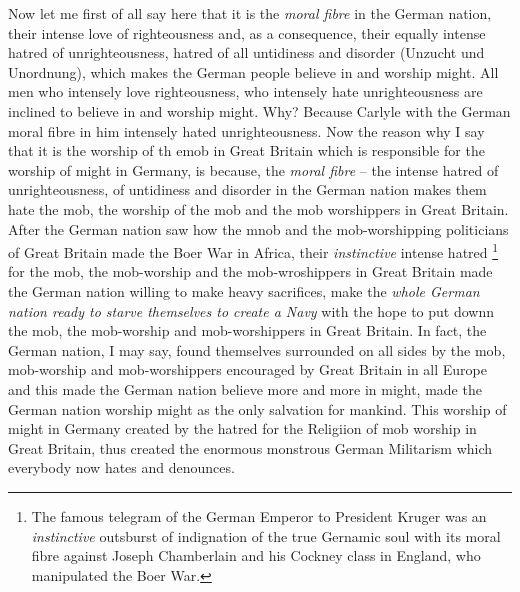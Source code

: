 Now let me first of all say here that it is the \emph{moral fibre} in the German nation, their intense love of righteousness and, as a consequence, their equally intense hatred of unrighteousness,
hatred of all untidiness and disorder (Unzucht und Unordnung),
which makes the German people believe in and worship might.
All men who intensely love righteousness,
who intensely hate unrighteousness are inclined to believe in and worship might.
Why? Because Carlyle with the German moral fibre in him intensely hated unrighteousness.
Now the reason why I say that it is the worship of th emob in Great Britain
which is responsible for the worship of might in Germany,
is because, the \emph{moral fibre} -- the intense hatred of unrighteousness,
of untidiness and disorder in the German nation makes them hate the mob,
the worship of the mob and the mob worshippers in Great Britain.
After the German nation saw how the mnob and the mob-worshipping politicians of Great Britain made the Boer War in Africa,
their \emph{instinctive} intense hatred \footnote{The famous telegram of the German Emperor to President Kruger was an \emph{instinctive} outsburst of indignation of the true Gernamic soul with its moral fibre against Joseph Chamberlain and his Cockney class in England, who manipulated the Boer War.}
for the mob, the mob-worship and the mob-wroshippers in Great Britain made the German nation willing to make heavy sacrifices, make the \emph{whole German nation ready to starve themselves to create a Navy} with the hope to put downn the mob,
the mob-worship and mob-worshippers in Great Britain.
In fact, the German nation, I may say, found themselves surrounded on all sides by the mob, mob-worship and mob-worshippers encouraged by Great Britain in all Europe and this made the German nation believe more and more in might,
made the German nation worship might as the only salvation for mankind.
This worship of might in Germany created by the hatred for the Religiion of mob worship in Great Britain, thus created the enormous monstrous German Militarism which everybody now hates and denounces.

